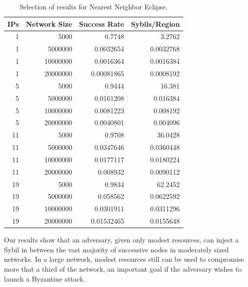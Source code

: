 \begin{table}\small
	\centering
	\caption{Selection of results for Nearest Neighbor Eclipse.}  %
	\label{tab:exp2}
	\begin{tabular}{|r|r|r|r|}
		\hline
		IPs & Network Size &  Success Rate & Sybils/Region \\ \hline
		1 & 5000 & 0.7748 & 3.2762 \\ \hline
		1 & 5000000 & 0.0032654 & 0.0032768 \\ \hline
		1& 10000000 & 0.0016364 & 0.0016384 \\ \hline
		1 & 20000000 & 0.00081865 & 0.0008192 \\ \hline
		5 & 5000 & 0.9444 & 16.381 \\ \hline
		5 & 5000000 & 0.0161208 & 0.016384 \\ \hline
		5 & 10000000 & 0.0081223 & 0.008192 \\ \hline
		5 & 20000000 & 0.0040801 & 0.004096 \\ \hline
		11 & 5000 & 0.9708 & 36.0428 \\ \hline
		11 & 5000000 & 0.0347646 & 0.0360448 \\ \hline
		11 & 10000000 & 0.0177117 & 0.0180224 \\ \hline
		11 & 20000000 & 0.008932 & 0.0090112 \\ \hline
		19 & 5000 & 0.9834 & 62.2452 \\ \hline
		19 & 5000000 & 0.058562 & 0.0622592 \\ \hline
		19 & 10000000 & 0.0301911 & 0.0311296 \\ \hline
		19 & 20000000 & 0.01532465 & 0.0155648 \\ \hline
	\end{tabular}
	
	
\end{table}

Our results show that an adversary, given only modest resources, can inject a Sybil in between the vast majority of successive nodes in moderately sized networks.
In a large network, modest resources still can be used to compromise more that a third of the network, an  important goal if the adversary  wishes to launch a Byzantine attack.

